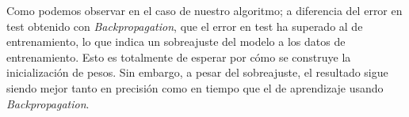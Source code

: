 Como podemos observar en el caso de nuestro 
algoritmo; a diferencia del error en test obtenido con \textit{Backpropagation}, que el error en test ha superado al de entrenamiento, lo que indica un sobreajuste 
del modelo a los datos de entrenamiento. Esto es totalmente de esperar por 
cómo se construye la inicialización de pesos. Sin embargo, a pesar del sobreajuste, el resultado sigue siendo mejor tanto en precisión como en tiempo que el de aprendizaje usando \textit{Backpropagation}.  



\newpage

